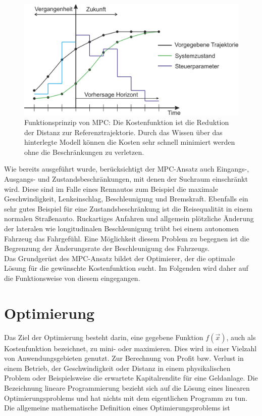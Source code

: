 \documentclass{like}
\begin{document}
\begin{figure}[ht!]
	\centering
	\includegraphics[width=400pt]{Abbildungen/mpcParadigm.png}
	\caption{Funktionsprinzip von \ac{MPC}: Die Kostenfunktion ist die Reduktion der Distanz zur Referenztrajektorie. Durch das Wissen über das hinterlegte Modell können die Kosten sehr schnell minimiert werden ohne die Bes\-chränk\-ung\-en zu verletzen.}
	\label{fig:mpcTheory}
\end{figure}

Wie bereits ausgeführt wurde, berücksichtigt der \ac{MPC}-Ansatz auch Eingangs-, Ausgangs- und Zu\-stands\-be\-schrän\-kungen, mit denen der Suchraum einschränkt wird. Diese sind im Falle eines Rennautos zum Beispiel die maximale Geschwindigkeit, Lenkeinschlag, Beschleunigung und Bremskraft. Ebenfalls ein sehr gutes Beispiel für eine Zu\-stands\-be\-schrän\-kung ist die Reisequalität in einem normalen Straßenauto. Ruckartiges Anfahren und allgemein plötzliche Änderung der lateralen wie longitudinalen Beschleunigung trübt bei einem autonomen Fahrzeug das Fahrgefühl. Eine Möglichkeit diesem Problem zu begegnen ist die Begrenzung der Änderungsrate der Beschleunigung des Fahrzeugs.\\

Das Grundgerüst des \ac{MPC}-Ansatz bildet der Optimierer, der die optimale Lösung für die gewünschte Kostenfunktion sucht. Im Folgenden wird daher auf die Funktionsweise von diesem eingegangen.


\section{Optimierung}
Das Ziel der Optimierung besteht darin, eine gegebene Funktion \(f(\vec{x})\), auch als Kosten\-funk\-ti\-on bezeichnet, zu mini- oder maximieren. 
Dies wird in einer Vielzahl von Anwendungs\-ge\-bie\-ten genutzt.
Zur Berechnung von Profit bzw. Verlust in einem Betrieb, der Geschwin\-dig\-keit oder Distanz in einem physikalischen Problem oder Beispielsweise die erwartete Kapital\-ren\-dite für eine Geldanlage.  
Die Bezeichnung lineare Programmierung bezieht sich auf die Lösung eines linearen  Optimierungsproblems und hat nichts mit dem eigentlichen Programm zu tun. 
Die allgemeine mathematische Definition eines Optimierungsproblems ist
\end{document}
